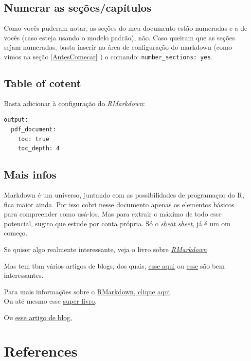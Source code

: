 \documentclass[]{book}
\begin{document}
\hypertarget{numerar-as-seuxe7uxf5escapuxedtulos}{%
\section{Numerar as seções/capítulos}\label{numerar-as-seuxe7uxf5escapuxedtulos}}

Como vocês puderam notar, as seções do meu documento estão numeradas e a de vocês (caso esteja usando o modelo padrão), não. Caso queiram que as seções sejam numeradas, basta inserir na área de configuração do markdown (como vimos na seção \ref{AntesComecar} ) o comando: \texttt{number\_sections:\ yes}.

\hypertarget{table-of-cotent}{%
\section{Table of cotent}\label{table-of-cotent}}

Basta adicionar à configuração do \emph{RMarkdown}:

\begin{verbatim}
output:
  pdf_document:
    toc: true
    toc_depth: 4
\end{verbatim}

\hypertarget{masInfos}{%
\section{Mais infos}\label{masInfos}}

Markdown é um universo, juntando com as possibilidades de programaçao do R, fica maior ainda. Por isso cobri nesse documento apenas os elementos básicos para compreender como usá-los. Mas para extrair o máximo de todo esse potencial, sugiro que estude por conta própria. Só o \href{https://www.rstudio.com/wp-content/uploads/2015/02/rmarkdown-cheatsheet.pdf}{\emph{sheat sheet}}, já é um om começo.

Se quiser algo realmente interessante, veja o livro sobre \href{https://bookdown.org/yihui/rmarkdown/}{\emph{RMarkdown}}

Mas tem tbm vários artigos de blogs, dos quais, \href{https://jozefhajnala.gitlab.io/r/r909-rmarkdown-tips/}{esse aqui} ou \href{https://sebastiansauer.github.io/writing_tools/}{esse} são bem interessantes.

Para mais informações sobre o \href{http://rmarkdown.rstudio.com}{RMarkdown, clique aqui}.\\
Ou até mesmo esse \href{https://bookdown.org/yihui/rmarkdown/}{super livro}.

Ou \href{https://www.r-bloggers.com/r-markdown-3-sources-of-reproducibility-issues-and-options-how-to-tackle-them/}{esse artigo de blog.}

\hypertarget{refs}{%
\chapter{References}\label{refs}}


\end{document}
